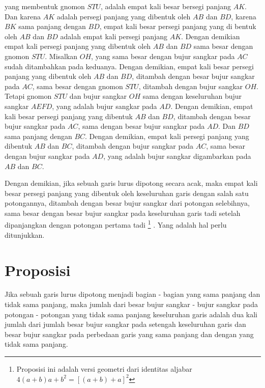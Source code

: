 \documentclass[a4paper]{book}
\begin{document}
yang membentuk gnomon $STU$, adalah empat kali besar bersegi panjang $AK$.
Dan karena $AK$ adalah persegi panjang yang dibentuk oleh $AB$ dan $BD$, karena
$BK$ sama panjang dengan $BD$, empat kali besar persegi panjang yang di bentuk
oleh $AB$ dan $BD$ adalah empat kali persegi panjang $AK$. Dengan demikian
empat kali persegi panjang yang dibentuk oleh $AB$ dan $BD$ sama besar dengan
gnomon $STU$. Misalkan $OH$, yang sama besar dengan bujur sangkar pada $AC$ 
sudah ditambahkan pada keduanya. Dengan demikian, empat kali besar persegi 
panjang yang dibentuk oleh $AB$ dan $BD$, ditambah dengan besar bujur sangkar
pada $AC$, sama besar dengan gnomon $STU$, ditambah dengan 
bujur sangkar $OH$. Tetapi gnomon $STU$ dan bujur sangkar $OH$ sama dengan keseluruhan
bujur sangkar $AEFD$, yang adalah bujur sangkar pada $AD$. Dengan demikian,
empat kali besar persegi panjang yang dibentuk $AB$ dan $BD$, ditambah dengan 
besar bujur sangkar pada $AC$, sama dengan besar bujur sangkar pada $AD$. Dan $BD$ 
sama panjang dengan $BC$. Dengan demikian, empat kali persegi panjang yang dibentuk 
$AB$ dan $BC$, ditambah dengan bujur sangkar pada $AC$, sama besar dengan bujur 
sangkar pada $AD$, yang adalah bujur sangkar digambarkan pada $AB$ dan $BC$. 

Dengan demikian, jika sebuah garis lurus dipotong secara acak, maka empat kali besar
persegi panjang yang dibentuk oleh keseluruhan garis dengan salah satu potongannya, 
ditambah dengan besar bujur sangkar dari potongan selebihnya, sama besar dengan besar
bujur sangkar pada keseluruhan garis tadi setelah dipanjangkan dengan potongan
pertama tadi \footnote{Proposisi ini adalah versi 
geometri dari identitas aljabar $4(a + b)a + b^2 = [(a + b) + a]^2$} .
Yang adalah hal perlu ditunjukkan.

\section*{\centering Proposisi \thesection} 

Jika sebuah garis lurus dipotong menjadi bagian - bagian yang sama panjang 
dan tidak sama panjang, maka jumlah dari besar bujur sangkar - bujur sangkar 
pada 
potongan - potongan yang
tidak sama panjang keseluruhan garis adalah dua kali jumlah dari jumlah besar
bujur sangkar pada setengah keseluruhan garis dan besar bujur sangkar pada
perbedaan garis yang sama panjang dan dengan yang tidak sama panjang.

\begin{center}
\end{center}
\end{document}
